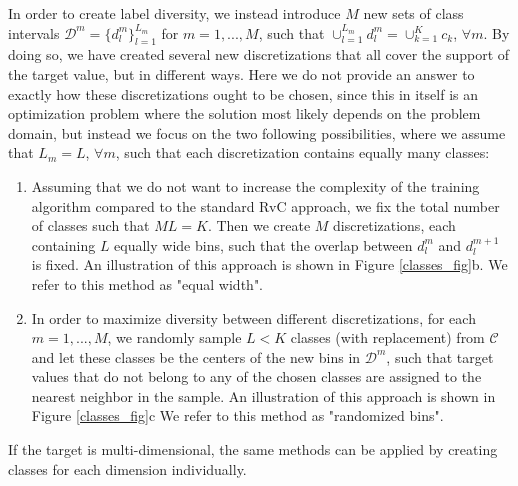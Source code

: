 \documentclass[10pt, conference, a4paper]{IEEEtran}
\begin{document}
In order to create label diversity, we instead introduce $M$ new sets of class intervals $\mathcal{D}^m = \{d^m_l\}_{l=1}^{L_m}$ for $m = 1,..., M$, such that $\cup_{l=1}^{L_m} d_l^m =  \cup_{k=1}^{K} c_k$, $\forall m$. By doing so, we have created several new discretizations that all cover the support of the target value, but in different ways. Here we do not provide an answer to exactly how these discretizations ought to be chosen, since this in itself is an optimization problem where the solution most likely depends on the problem domain, but instead we focus on the two following possibilities, where we assume that $L_m = L$, $\forall m$, such that each discretization contains equally many classes:
\begin{enumerate}

\item Assuming that we do not want to increase the complexity of the training algorithm compared to the standard RvC approach, we fix the total number of classes such that $ML = K$. Then we create $M$ discretizations, each containing $L$ equally wide bins, such that the overlap between $d_l^m$ and $d_l^{m+1}$ is fixed. An illustration of this approach is shown in Figure \ref{classes_fig}b. We refer to this method as "equal width".
\item In order to maximize diversity between different discretizations, for each $m = 1, ..., M$, we randomly sample $L < K$ classes (with replacement) from $\mathcal{C}$ and let these classes be the centers of the new bins in $\mathcal{D}^m$, such that target values that do not belong to any of the chosen classes are assigned to the nearest neighbor in the sample. An illustration of this approach is shown in Figure \ref{classes_fig}c We refer to this method as "randomized bins".
\end{enumerate}

If the target is multi-dimensional, the same methods can be applied by creating classes for each dimension individually. 
\end{document}
